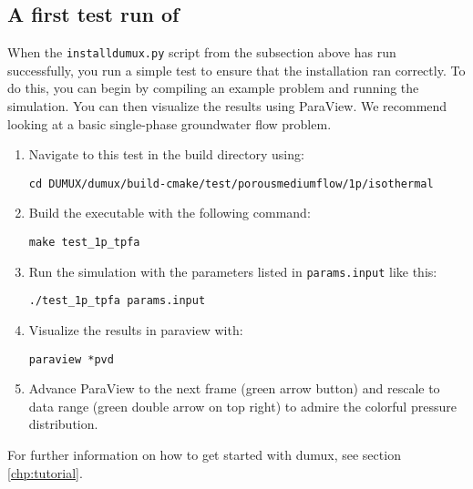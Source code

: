 \subsection{A first test run of \Dumux}
When the \texttt{installdumux.py} script from the subsection above has run successfully,
you run a simple test to ensure that the installation ran correctly. To do this, you can
begin by compiling an example problem and running the simulation. You can then visualize
the results using ParaView. We recommend looking at a basic single-phase groundwater flow problem.
\begin{enumerate}
\item Navigate to this test in the build directory using:
\begin{lstlisting}[style=Bash]
cd DUMUX/dumux/build-cmake/test/porousmediumflow/1p/isothermal
\end{lstlisting}
\item Build the executable with the following command:
\begin{lstlisting}[style=Bash]
make test_1p_tpfa
\end{lstlisting}
\item Run the simulation with the parameters listed in \texttt{params.input} like this:
\begin{lstlisting}[style=Bash]
./test_1p_tpfa params.input
\end{lstlisting}
\item Visualize the results in paraview with:
\begin{lstlisting}[style=Bash]
paraview *pvd
\end{lstlisting}
\item Advance ParaView to the next frame (green arrow button) and rescale to data range
(green double arrow on top right) to admire the colorful pressure distribution.
\end{enumerate}

For further information on how to get started with dumux, see section \ref{chp:tutorial}.

